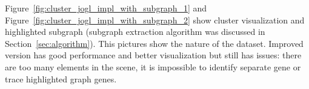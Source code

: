 Figure~\ref{fig:cluster_jogl_impl_with_subgraph_1} and Figure~\ref{fig:cluster_jogl_impl_with_subgraph_2} show cluster visualization and highlighted subgraph (subgraph extraction algorithm was discussed in Section~\ref{sec:algorithm}). This pictures show the nature of the dataset. Improved version has good performance and better visualization but still has issues: there are too many elements in the scene, it is impossible to identify separate gene or trace highlighted graph genes.

\begin{figure}[h!]
\centering
{}
\end{figure}
